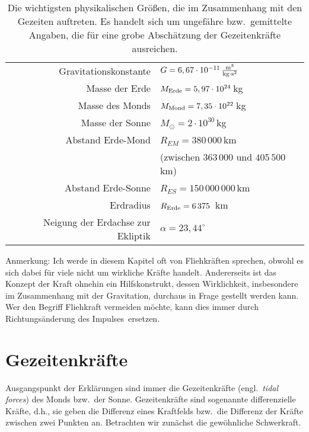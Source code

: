 \begin{table}[htb]
\begin{tabular}{r|l}
Gravitationskonstante & $G= 6,67 \cdot 10^{-11}\,{\rm \frac{m^3}{kg\cdot s^2}}$  \\  
Masse der Erde & $M_{\rm Erde} = 5,97\cdot 10^{24}$\,kg  \\ 
Masse des Monds &  $ M_{\rm Mond} =7,35 \cdot 10^{22}$\,kg  \\
Masse der Sonne &  $ M_\odot = 2\cdot 10^{30}$\,kg  \\
Abstand Erde-Mond &  $R_{EM} = 380\,000$\,km  \\[-0.2cm] 
 & (zwischen $363\,000$ und $405\,500$\,km) \\
Abstand Erde-Sonne &  $R_{ES} = 150\,000\,000$\,km   \\
Erdradius &   $R_{\rm Erde} =  6\,375$\, km \\
Neigung der Erdachse zur Ekliptik&   $\alpha = 23,44^\circ $  \\
\end{tabular}
\caption{\label{tab_Tide}%
Die wichtigsten physikalischen Gr\"o\ss en, die im Zusammenhang mit den Gezeiten
auftreten. Es handelt sich um ungef\"ahre bzw.\ gemittelte Angaben, die f\"ur eine grobe Absch\"atzung
der Gezeitenkr\"afte ausreichen.}
\end{table}
%

Anmerkung: Ich werde in diesem Kapitel oft von Fliehkr\"aften sprechen, 
obwohl es sich dabei f\"ur
viele nicht um wirkliche Kr\"afte handelt. Andererseits ist das Konzept der Kraft ohnehin ein
Hilfskonstrukt, dessen \glqq Wirklichkeit\grqq, insbesondere im Zusammenhang mit der Gravitation,
durchaus in Frage gestellt werden kann. Wer den Begriff Fliehkraft vermeiden m\"ochte, kann dies
immer durch \glqq Richtungs\"anderung des Impulses\grqq\ ersetzen. 


\section{Gezeitenkr\"afte}

Ausgangspunkt der Erkl\"arungen sind immer die 
Gezeitenkr\"afte (engl.\ \textit{tidal forces}) 
des Monds bzw.\ der Sonne. Gezeitenkr\"afte sind 
sogenannte \glqq differenzielle Kr\"afte\grqq,
d.h., sie geben die Differenz eines Kraftfelds bzw.\ die Differenz der Kr\"afte zwischen zwei Punkten an. 
Betrachten wir zun\"achst die gew\"ohnliche Schwerkraft.

